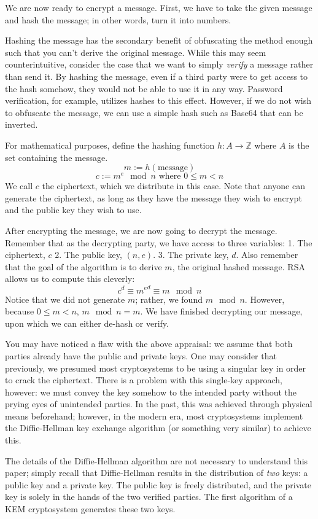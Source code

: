 \documentclass[a4paper]{article}
\begin{document}
 We are now ready to encrypt a
message. First, we have to take the given message and hash the message;
in other words, turn it into numbers.

Hashing the message has the secondary benefit of obfuscating the method
enough such that you can't derive the original message. While this may
seem counterintuitive, consider the case that we want to simply
\emph{verify} a message rather than send it. By hashing the message,
even if a third party were to get access to the hash somehow, they would
not be able to use it in any way. Password verification, for example,
utilizes hashes to this effect. However, if we do not wish to obfuscate
the message, we can use a simple hash such as Base64 that can be
inverted.

For mathematical purposes, define the hashing function
\(h: A \to \mathbb{Z}\) where \(A\) is the set containing the message.
\[ m := h(\text{message})\]
\[ c := m^e\mod{n} \text{  where } 0 \leq m < n\] We call \(c\) the
ciphertext, which we distribute in this case. Note that anyone can
generate the ciphertext, as long as they have the message they wish to
encrypt and the public key they wish to use.

After encrypting the message, we are now going
to decrypt the message. Remember that as the decrypting party, we have
access to three variables: 1. The ciphertext, \(c\) 2. The public key,
\((n, e)\). 3. The private key, \(d\). Also remember that the goal of
the algorithm is to derive \(m\), the original hashed message. RSA
allows us to compute this cleverly:\\
\[ c^d \equiv {m^e}^d \equiv m \mod{n}\] Notice that we did not generate
\(m\); rather, we found \(m \mod{n}\). However, because
\(0 \leq m < n\), \(m \mod{n} = m\). We have finished decrypting our
message, upon which we can either de-hash or verify.

You may have noticed a flaw with the above appraisal: we assume that
both parties already have the public and private keys. One may consider
that previously, we presumed most cryptosystems to be using a singular
key in order to crack the ciphertext. There is a problem with this
single-key approach, however: we must convey the key somehow to the
intended party without the prying eyes of unintended parties. In the
past, this was achieved through physical means beforehand; however, in
the modern era, most cryptosystems implement the Diffie-Hellman key
exchange algorithm (or something very similar) to achieve this.

The details of the Diffie-Hellman algorithm are not necessary to
understand this paper; simply recall that Diffie-Hellman results in the
distribution of \emph{two} keys: a public key and a private key. The
public key is freely distributed, and the private key is solely in the
hands of the two verified parties. The first algorithm of a KEM
cryptosystem generates these two keys.
\end{document}
